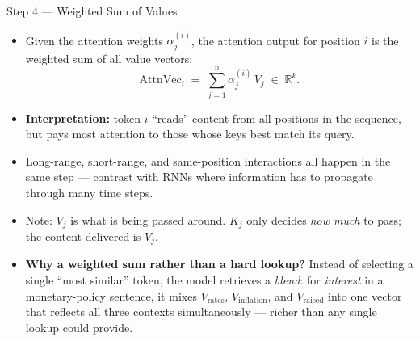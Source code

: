 \documentclass[10pt,english,aspectratio=169]{beamer}
\begin{document}
\begin{frame}{Step 4 --- Weighted Sum of Values}
\begin{itemize}
\item Given the attention weights $\alpha_{j}^{(i)}$, the attention output for position $i$ is the weighted sum of all value vectors:
\[
   \text{AttnVec}_{i} \;=\; \sum_{j=1}^{n} \alpha_{j}^{(i)}\, V_{j} \;\in\; \mathbb{R}^{k}.
\]

\medskip
\item \textbf{Interpretation:} token $i$ ``reads'' content from all positions in the sequence, but pays most attention to those whose keys best match its query.

\medskip
\item Long-range, short-range, and same-position interactions all happen in the same step --- contrast with RNNs where information has to propagate through many time steps.

\medskip
\item Note: $V_j$ is what is being passed around. $K_j$ only decides \emph{how much} to pass; the content delivered is $V_j$.

\medskip
\item \textbf{Why a weighted sum rather than a hard lookup?} Instead of selecting a single ``most similar'' token, the model retrieves a \emph{blend}: for \textit{interest} in a monetary-policy sentence, it mixes $V_{\text{rates}}$, $V_{\text{inflation}}$, and $V_{\text{raised}}$ into one vector that reflects all three contexts simultaneously --- richer than any single lookup could provide.
\end{itemize}
\end{frame}
\end{document}
